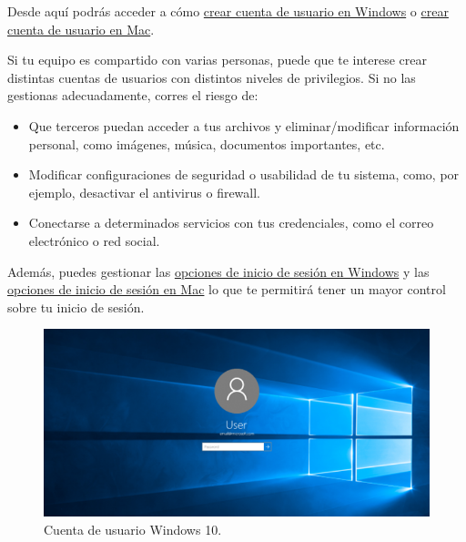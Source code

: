 \documentclass[
  spanish,
  a4paper,
  openany]{book}
\begin{document}
Desde aquí podrás acceder a cómo \href{https://support.microsoft.com/es-es/windows/crear-una-cuenta-de-administrador-o-de-usuario-local-en-windows-10-20de74e0-ac7f-3502-a866-32915af2a34d}{crear cuenta de usuario en Windows} o \href{https://support.apple.com/es-es/guide/mac-help/mtusr001/mac\#:~:text=A\%C3\%B1adir\%20un\%20usuario,en\%20\%E2\%80\%9CUsuarios\%20y\%20grupos\%E2\%80\%9D.\&text=Si\%20el\%20candado\%20situado\%20en,bajo\%20la\%20lista\%20de\%20usuarios}{crear cuenta de usuario en Mac}.

Si tu equipo es compartido con varias personas, puede que te interese crear distintas cuentas de usuarios con distintos niveles de privilegios. Si no las gestionas
adecuadamente, corres el riesgo de:

\begin{itemize}
\item
  Que terceros puedan acceder a tus archivos y eliminar/modificar información personal, como imágenes, música, documentos importantes, etc.
\item
  Modificar configuraciones de seguridad o usabilidad de tu sistema, como, por ejemplo, desactivar el antivirus o firewall.
\item
  Conectarse a determinados servicios con tus credenciales, como el correo electrónico o red social.
\end{itemize}

Además, puedes gestionar las \href{https://support.microsoft.com/es-es/windows/las-opciones-de-inicio-de-sesi\%C3\%B3n-de-windows-10-y-la-protecci\%C3\%B3n-de-la-cuenta-7b34d4cf-794f-f6bd-ddcc-e73cdf1a6fbf}{opciones de inicio de sesión en Windows} y las \href{https://support.apple.com/es-es/guide/mac-help/mtusr005/mac}{opciones de inicio de sesión en Mac} lo que te permitirá tener un mayor control sobre tu inicio de sesión.

\begin{figure}

{\centering \includegraphics[width=0.75\linewidth]{images/cuenta-usuario-windows-10} 

}

\caption{Cuenta de usuario Windows 10.}\label{fig:unnamed-chunk-9}
\end{figure}
\end{document}
